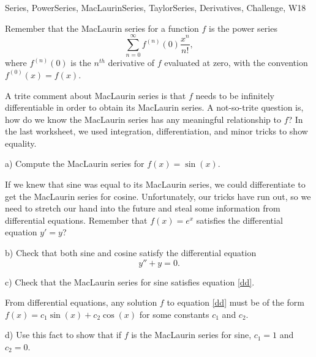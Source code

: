  

\begin{tagblock}{Series, PowerSeries, MacLaurinSeries, TaylorSeries, Derivatives, Challenge, W18}
\begin{question}

Remember that the MacLaurin series for a function $f$ is the power series 
\begin{equation}\label{mac}
\sum_{n=0}^{\infty}f^{(n)}(0)\frac{x^n}{n!},
\end{equation}
where $f^{(n)}(0)$ is the $n^{th}$ derivative of $f$ evaluated at zero, with the convention $f^{(0)}(x)=f(x)$. 

A trite comment about MacLaurin series is that $f$ needs to be infinitely differentiable in order to obtain its MacLaurin series. A not-so-trite question is, how do we know the MacLaurin series has any meaningful relationship to $f$? In the last worksheet, we used integration, differentiation, and minor tricks to show equality.

\bigskip

a) Compute the MacLaurin series for $f(x)=\sin(x)$.

\bigskip

If we knew that sine was equal to its MacLaurin series, we could differentiate to get the MacLaurin series for cosine. Unfortunately, our tricks have run out, so we need to stretch our hand into the future and steal some information from differential equations. Remember that $f(x)=e^x$ satisfies the differential equation $y'=y$? 
\bigskip

b) Check that both sine and cosine satisfy the differential equation 
\begin{equation}\label{dd}
y''+y=0.
\end{equation}

\bigskip

c) Check that the MacLaurin series for sine satisfies equation \eqref{dd}. 

\bigskip

From differential equations, any solution $f$ to equation \eqref{dd} must be of the form $f(x)=c_1\sin(x)+c_2\cos(x)$ for some constants $c_1$ and $c_2$. 

\bigskip

d) Use this fact to show that if $f$ is the MacLaurin series for sine, $c_1=1$ and $c_2=0$. 

\bigskip


\end{question}
\end{tagblock}
